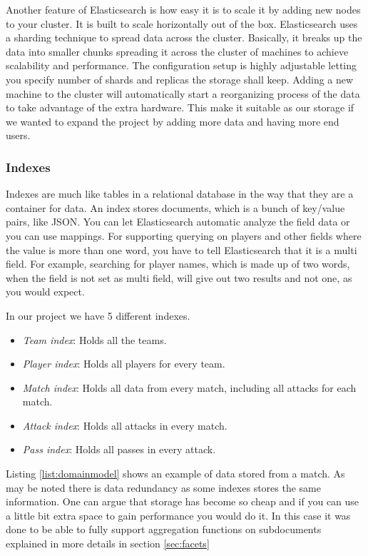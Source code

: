 Another feature of Elasticsearch is how easy it is to scale it by adding new nodes to your cluster. It is built to scale horizontally out of the box. Elasticsearch uses a sharding technique to spread data across the cluster.  Basically, it breaks up the data into smaller chunks spreading it across the cluster of machines to achieve scalability and performance. The configuration setup is highly adjustable letting you specify number of shards and replicas the storage shall keep. Adding a new machine to the cluster will automatically start a reorganizing process of the data to take advantage of the extra hardware. This make it suitable as our storage if we wanted to expand the project by adding more data and having more end users.


\subsubsection{Indexes}

Indexes are much like tables in a relational database in the way that they are a container for data. An index stores documents, which is a bunch of key/value pairs, like \ac{JSON}. You can let Elasticsearch automatic analyze the field data or you can use mappings. For supporting querying on players and other fields where the value is more than one word, you have to tell Elasticsearch that it is a multi field. For example, searching for player names, which is made up of two words, when the field is not set as multi field, will give out two results and not one, as you would expect.

In our project we have 5 different indexes. 
\begin{itemize}
\item \emph{Team index}: Holds all the teams.
\item \emph{Player index}: Holds all players for every team.
\item \emph{Match index}: Holds all data from every match, including all attacks for each match.
\item \emph{Attack index}: Holds all attacks in every match.
\item \emph{Pass index}: Holds all passes in every attack.
\end{itemize}

Listing \ref{list:domainmodel} shows an example of data stored from a match. As may be noted there is data redundancy as some indexes stores the same information. One can argue that storage has become so cheap and if you can use a little bit extra space to gain performance you would do it. In this case it was done to be able to fully support aggregation functions on subdocuments explained in more details in section \ref{sec:facets}

